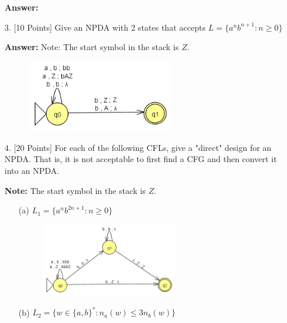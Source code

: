 \documentclass[12pt]{article}
\begin{document}
\begin{spacing}{1.5}
\begin{enumerate}
                  \textbf{Answer:}

            \item[3.] [10 Points] Give an NPDA with 2 states that accepts $L=\{a^nb^{n+1} : n \geq 0\}$

                  \textbf{Answer:} Note: The start symbol in the stack is $Z$.

                  \begin{figure}[h!]
                        \centering
                        \includegraphics[width=0.6\textwidth]{img/q3/q3.png}
                  \end{figure}

                  \newpage
            \item[4.] [20 Points] For each of the following CFLs, give a "direct" design for an NPDA. That is, it is not acceptable to first find a CFG and then convert it into an NPDA.

                  \textbf{Note:} The start symbol in the stack is $Z$.

                  \begin{enumerate}
                        \item[(a)] $L_1=\{a^nb^{2n+1} : n \geq 0 \}$

                              \begin{figure}[h!]
                                    \centering
                                    \includegraphics[width=0.6\textwidth]{img/q4/q4a.png}
                              \end{figure}

                        \item[(b)] $L_2=\{w \in \{a,b \}^* : n_a(w) \leq 3n_b(w) \}$


\end{enumerate}
\end{enumerate}
\end{spacing}
\end{document}
